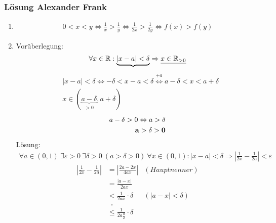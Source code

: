
\subsubsection{Lösung Alexander Frank}
\begin{enumerate}[label = \alph*)]
    \item 
    \begin{align*}
        0 < x < y \Leftrightarrow \frac{1}{x} > \frac{1}{y} \Leftrightarrow \frac{1}{2x} > \frac{1}{2y} \Leftrightarrow f(x) > f(y)
    \end{align*}
    \item Vorüberlegung:
    \begin{align*}
        \forall x \in \mathbb R: \underbrace{|x - a| < \delta} \Rightarrow \underline{x \in \mathbb R_{>0}}
    \end{align*}
    \begin{align*}
        &|x - a| < \delta \Leftrightarrow -\delta < x - a < \delta \overset{+a}{\Leftrightarrow} a - \delta < x < a +\delta\\
        & x \in (\underbrace{a - \delta}_{> 0}, a + \delta)
    \end{align*}
    \begin{align*}
        a - \delta > 0 \Leftrightarrow a > \delta \\
        \bf{a > \delta > 0}
    \end{align*}
    \newpage
    Lösung:
    \begin{align*}
        \forall a \in (0,1) \: \exists \varepsilon > 0 \: \exists \delta > 0 \: (a > \delta > 0) \: \forall x \in (0,1): |x - a| < \delta \Rightarrow |\frac{1}{2x} - \frac{1}{2a}| < \varepsilon
    \end{align*}
    \begin{align*}
        | \frac{1}{2x} - \frac{1}{2a}| &= |\frac{2a - 2x}{4ax}| & (Hauptnenner)\\
        &= \frac{|a-x|}{2ax}\\
        &< \frac{1}{2ax} \cdot \delta & (|a - x| < \delta)\\
        &\overset{^*}{\leq} \frac{1}{2a\frac{a}{2}} \cdot \delta\\

\end{align*}
\end{enumerate}
